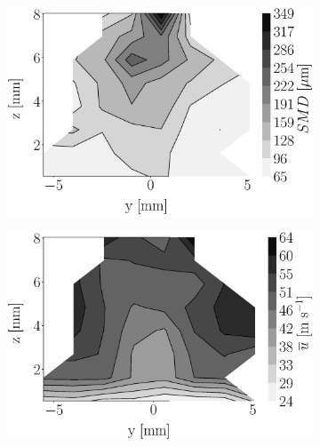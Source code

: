 

\begin{figure}[h!]
\flushleft
\begin{subfigure}[b]{0.22\textwidth}
	\centering
   \includegraphics[scale=0.17]{./part2_developments/figures_ch5_resolved_JICF/injectors_SLI/uG75_dx20_x10_SMD_map.eps}
\end{subfigure}
   \hspace{0.17in}
\begin{subfigure}[b]{0.22\textwidth}
	\centering
   \includegraphics[scale=0.17]{./part2_developments/figures_ch5_resolved_JICF/injectors_SLI/uG75_dx20_x10_ux_mean_map.eps}
\end{subfigure}
   \hspace{0.17in}

\end{figure}

